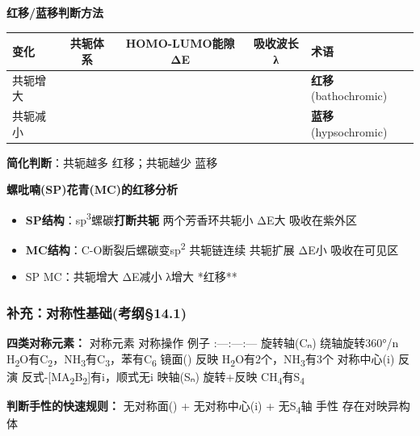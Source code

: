 \textbf{红移/蓝移判断方法}

{\def\LTcaptype{none} %
\begin{longtable}[]{@{}lcccl@{}}
\toprule\noalign{}
变化 & 共轭体系 & HOMO-LUMO能隙ΔE & 吸收波长λ & 术语 \\
\midrule\noalign{}
\endhead
\bottomrule\noalign{}
\endlastfoot
共轭增大 &  &  &  & \textbf{红移}(bathochromic) \\
共轭减小 &  &  &  & \textbf{蓝移}(hypsochromic) \\
\end{longtable}
}

\textbf{简化判断}：共轭越多 \箭 红移；共轭越少 \箭 蓝移

\textbf{螺吡喃(SP)\箭 花青(MC)的红移分析}

\begin{itemize}
\tightlist
\item
  \textbf{SP结构}：sp\textsuperscript{3}螺碳\textbf{打断共轭} \箭 两个芳香环 \箭 共轭小 \箭 ΔE大 \箭 吸收在紫外区
\item
  \textbf{MC结构}：C-O断裂后螺碳变sp\textsuperscript{2} \箭 共轭链连续 \箭 共轭扩展 \箭 ΔE小 \箭 吸收在可见区
\item
  SP \箭 MC：共轭增大 \箭 ΔE减小 \箭 λ增大 \箭 **红移**
\end{itemize}

\subsubsection{补充：对称性基础(考纲§14.1)}\label{ux8865ux5145ux5bf9ux79f0ux6027ux57faux7840ux8003ux7eb214.1}

\textbf{四类对称元素：}
\textbar{} 对称元素 \textbar{} 对称操作 \textbar{} 例子 \textbar{}
\textbar:---\textbar:---\textbar:---\textbar{}
\textbar{} 旋转轴(Cₙ) \textbar{} 绕轴旋转360°/n \textbar{} H\textsubscript{2}O有C\textsubscript{2}，NH\textsubscript{3}有C\textsubscript{3}，苯有C\textsubscript{6} \textbar{}
\textbar{} 镜面() \textbar{} 反映 \textbar{} H\textsubscript{2}O有2个，NH\textsubscript{3}有3个 \textbar{}
\textbar{} 对称中心(i) \textbar{} 反演 \textbar{} 反式-{[}MA\textsubscript{2}B\textsubscript{2}{]}有i，顺式无i \textbar{}
\textbar{} 映轴(Sₙ) \textbar{} 旋转+反映 \textbar{} CH\textsubscript{4}有S\textsubscript{4} \textbar{}

\textbf{判断手性的快速规则：}
无对称面() + 无对称中心(i) + 无S\textsubscript{4}轴 \箭 手性 \箭 存在对映异构体

